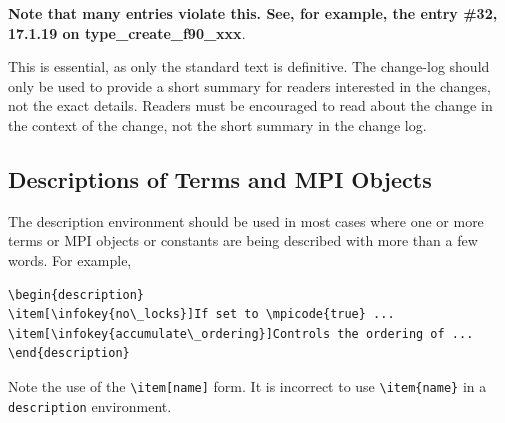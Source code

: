 \documentclass[letterpaper,twoside,11pt,fleqn]{article}
\def\MPI/{\textsf{MPI}}    %
\begin{document}
\textbf{Note that many entries violate this.  See, for example, the
  entry \#32, 17.1.19 on type\_create\_f90\_xxx}.

This is essential, as only the standard text is definitive.  The
change-log should only be used to provide a short summary for readers
interested in the changes, not the exact details.  Readers must be
encouraged to read about the change in the context of the change, not
the short summary in the change log.

\subsection{Descriptions of Terms and \texorpdfstring{\MPI/}{MPI} Objects}
\label{sec:description}
The description environment should be used in most cases where one or
more terms or \MPI/ objects or constants are being described with more
than a few words. For example,
\begin{verbatim}
\begin{description}
\item[\infokey{no\_locks}]If set to \mpicode{true} ...
\item[\infokey{accumulate\_ordering}]Controls the ordering of ...
\end{description}
\end{verbatim}
Note the use of the \verb+\item[name]+ form. It is incorrect to use
\verb+\item{name}+ in a \texttt{description} environment.
\end{document}
